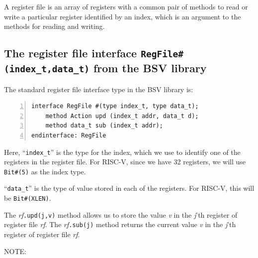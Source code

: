 \label{Sec_Register_files}


A register file is an array of registers with a common pair of methods
to read or write a particular register identified by an index, which
is an argument to the methods for reading and writing.


\subsection{The register file interface {\tt RegFile\#(index\_t,data\_t)} from the BSV library}

\label{Sec_RegFile_interface}



The standard register file interface type in the BSV library is:

{\small
\begin{Verbatim}[frame=single, numbers=left]
interface RegFile #(type index_t, type data_t);
    method Action upd (index_t addr, data_t d);
    method data_t sub (index_t addr);
endinterface: RegFile
\end{Verbatim}
}

Here, ``\verb|index_t|'' is the type for the index, which we use to
identify one of the registers in the register file.  For RISC-V, since
we have 32 registers, we will use \verb|Bit#(5)| as the index type.

``\verb|data_t|'' is the type of value stored in each of the
registers.  For RISC-V, this will be \verb|Bit#(XLEN)|.

The \emph{rf}{\tt.upd(j,v)} method allows us to store the value
\emph{v} in the \emph{j}'th register of register file \emph{rf}.  The
\emph{rf}{\tt.sub(j)} method returns the current value \emph{v} in the
\emph{j}'th register of register file \emph{rf}.

\vspace{2ex}

NOTE:

